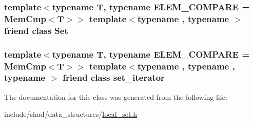 \hypertarget{classshad_1_1LocalSet_abe8ae75525fd5b29f58e1b5537b92ba1}{
\subsubsection[{Set}]{\setlength{\rightskip}{0pt plus 5cm}template$<$typename T, typename E\-L\-E\-M\-\_\-\-C\-O\-M\-P\-A\-R\-E = Mem\-Cmp$<$\-T$>$$>$ template$<$typename , typename $>$ friend class {\bf Set}\hspace{0.3cm}{\ttfamily [friend]}}}\label{classshad_1_1LocalSet_abe8ae75525fd5b29f58e1b5537b92ba1}
\hypertarget{classshad_1_1LocalSet_a51032913d89093f66aa9219f72afe821}{
\subsubsection[{set\-\_\-iterator}]{\setlength{\rightskip}{0pt plus 5cm}template$<$typename T, typename E\-L\-E\-M\-\_\-\-C\-O\-M\-P\-A\-R\-E = Mem\-Cmp$<$\-T$>$$>$ template$<$typename , typename , typename $>$ friend class {\bf set\-\_\-iterator}\hspace{0.3cm}{\ttfamily [friend]}}}\label{classshad_1_1LocalSet_a51032913d89093f66aa9219f72afe821}


The documentation for this class was generated from the following file\-:\begin{DoxyCompactItemize}
\item 
include/shad/data\-\_\-structures/\hyperlink{local__set_8h}{local\-\_\-set.\-h}\end{DoxyCompactItemize}
